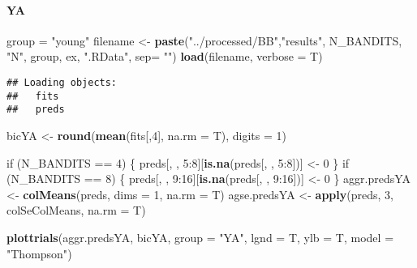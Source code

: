 \documentclass[11pt,,]{article}
\newenvironment{Shaded}{\begin{snugshade}}{\end{snugshade}}
\newcommand{\KeywordTok}[1]{\textcolor[rgb]{0.13,0.29,0.53}{\textbf{{#1}}}}
\newcommand{\DataTypeTok}[1]{\textcolor[rgb]{0.13,0.29,0.53}{{#1}}}
\newcommand{\DecValTok}[1]{\textcolor[rgb]{0.00,0.00,0.81}{{#1}}}
\newcommand{\StringTok}[1]{\textcolor[rgb]{0.31,0.60,0.02}{{#1}}}
\newcommand{\NormalTok}[1]{{#1}}
\let\oldparagraph\paragraph
\renewcommand{\paragraph}[1]{\oldparagraph{#1}\mbox{}}
\begin{document}
\paragraph{YA}\label{ya-1}

\begin{Shaded}
\begin{Highlighting}[]
\NormalTok{group =}\StringTok{ "young"}
\NormalTok{filename  <-}\StringTok{ }\KeywordTok{paste}\NormalTok{(}\StringTok{"../processed/BB"}\NormalTok{,}\StringTok{"results"}\NormalTok{, N_BANDITS, }\StringTok{"N"}\NormalTok{, }
    \NormalTok{group, ex, }\StringTok{".RData"}\NormalTok{, }\DataTypeTok{sep=} \StringTok{""}\NormalTok{)}
\KeywordTok{load}\NormalTok{(filename, }\DataTypeTok{verbose =} \NormalTok{T)}
\end{Highlighting}
\end{Shaded}

\begin{verbatim}
## Loading objects:
##   fits
##   preds
\end{verbatim}

\begin{Shaded}
\begin{Highlighting}[]
\NormalTok{bicYA <-}\StringTok{ }\KeywordTok{round}\NormalTok{(}\KeywordTok{mean}\NormalTok{(fits[,}\DecValTok{4}\NormalTok{], }\DataTypeTok{na.rm =} \NormalTok{T), }\DataTypeTok{digits =} \DecValTok{1}\NormalTok{)}

\NormalTok{if (N_BANDITS ==}\StringTok{ }\DecValTok{4}\NormalTok{) \{}
    \NormalTok{preds[, , }\DecValTok{5}\NormalTok{:}\DecValTok{8}\NormalTok{][}\KeywordTok{is.na}\NormalTok{(preds[, , }\DecValTok{5}\NormalTok{:}\DecValTok{8}\NormalTok{])] <-}\StringTok{ }\DecValTok{0}
\NormalTok{\}}
\NormalTok{if (N_BANDITS ==}\StringTok{ }\DecValTok{8}\NormalTok{) \{}
    \NormalTok{preds[, , }\DecValTok{9}\NormalTok{:}\DecValTok{16}\NormalTok{][}\KeywordTok{is.na}\NormalTok{(preds[, , }\DecValTok{9}\NormalTok{:}\DecValTok{16}\NormalTok{])] <-}\StringTok{ }\DecValTok{0}
\NormalTok{\}}
\NormalTok{aggr.predsYA <-}\StringTok{ }\KeywordTok{colMeans}\NormalTok{(preds, }\DataTypeTok{dims =} \DecValTok{1}\NormalTok{, }\DataTypeTok{na.rm =} \NormalTok{T) }
\NormalTok{agse.predsYA <-}\StringTok{ }\KeywordTok{apply}\NormalTok{(preds, }\DecValTok{3}\NormalTok{, colSeColMeans, }\DataTypeTok{na.rm =} \NormalTok{T) }
\end{Highlighting}
\end{Shaded}

\begin{Shaded}
\begin{Highlighting}[]
\KeywordTok{plottrials}\NormalTok{(aggr.predsYA, bicYA, }\DataTypeTok{group =} \StringTok{"YA"}\NormalTok{, }\DataTypeTok{lgnd =} \NormalTok{T, }\DataTypeTok{ylb =} \NormalTok{T, }\DataTypeTok{model =} \StringTok{"Thompson"}\NormalTok{)}
\end{Highlighting}
\end{Shaded}
\end{document}
